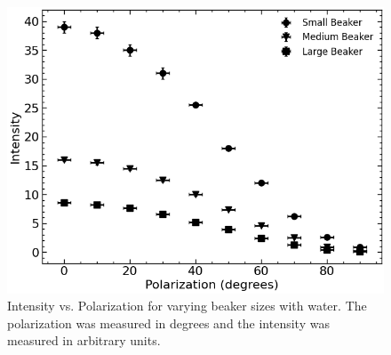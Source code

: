 \begin{figure}[H]
    \begin{center}
        \includegraphics[width=\columnwidth]{../figures/water.png}
    \end{center}
    \caption{Intensity vs. Polarization for varying beaker sizes with water. The polarization was measured in degrees and the intensity was measured in arbitrary units.}
    \label{fig:water}
\end{figure}

